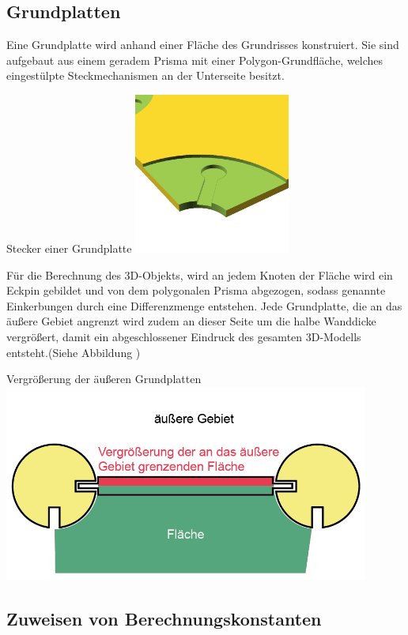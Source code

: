 \subsection{Grundplatten}
Eine Grundplatte wird anhand einer Fläche des Grundrisses konstruiert.
Sie sind aufgebaut aus einem geradem Prisma mit einer Polygon-Grundfläche, welches eingestülpte Steckmechanismen an der Unterseite besitzt.
\begin{Bild}{Stecker einer Grundplatte}
	\includegraphics[height=200px]{Bilder/Untereinheit_GP}
\end{Bild}
Für die Berechnung des 3D-Objekts, wird an jedem Knoten der Fläche wird ein Eckpin gebildet und von dem polygonalen Prisma abgezogen, sodass genannte Einkerbungen durch eine Differenzmenge entstehen. 
Jede Grundplatte, die an das äußere Gebiet angrenzt wird zudem an dieser Seite um die halbe Wanddicke vergrößert, damit ein abgeschlossener Eindruck des gesamten 3D-Modells entsteht.(Siehe Abbildung \thebildnr)
\begin{Bild}{Vergrößerung der äußeren Grundplatten}
	\includegraphics[width=120mm]{Bilder/GrundplatteVergroesserung-08}
\end{Bild}



\subsection{Zuweisen von Berechnungskonstanten}
\label{params}
